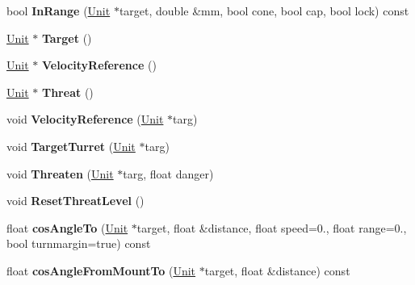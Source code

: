 \begin{DoxyCompactItemize}
\item 
bool {\bfseries In\+Range} (\hyperlink{classUnit}{Unit} $\ast$target, double \&mm, bool cone, bool cap, bool lock) const \hypertarget{classUnit_ac5838cd5a2f8cb75fe567662afcbe899}{}\label{classUnit_ac5838cd5a2f8cb75fe567662afcbe899}

\item 
\hyperlink{classUnit}{Unit} $\ast$ {\bfseries Target} ()\hypertarget{classUnit_a7716836bf2d5b411a380e64ae47b8523}{}\label{classUnit_a7716836bf2d5b411a380e64ae47b8523}

\item 
\hyperlink{classUnit}{Unit} $\ast$ {\bfseries Velocity\+Reference} ()\hypertarget{classUnit_aca84fd72d674597d57c82a50035d31e9}{}\label{classUnit_aca84fd72d674597d57c82a50035d31e9}

\item 
\hyperlink{classUnit}{Unit} $\ast$ {\bfseries Threat} ()\hypertarget{classUnit_a63be532632c7f513ca2d74a41ee18498}{}\label{classUnit_a63be532632c7f513ca2d74a41ee18498}

\item 
void {\bfseries Velocity\+Reference} (\hyperlink{classUnit}{Unit} $\ast$targ)\hypertarget{classUnit_ad06dffadc235ca125e32af477b0a5e54}{}\label{classUnit_ad06dffadc235ca125e32af477b0a5e54}

\item 
void {\bfseries Target\+Turret} (\hyperlink{classUnit}{Unit} $\ast$targ)\hypertarget{classUnit_a0821361af528c13ad875289aec584599}{}\label{classUnit_a0821361af528c13ad875289aec584599}

\item 
void {\bfseries Threaten} (\hyperlink{classUnit}{Unit} $\ast$targ, float danger)\hypertarget{classUnit_a790cbe6ad8231dfc848b898a113e755c}{}\label{classUnit_a790cbe6ad8231dfc848b898a113e755c}

\item 
void {\bfseries Reset\+Threat\+Level} ()\hypertarget{classUnit_ae3b1150e80b1674111a178e32de97875}{}\label{classUnit_ae3b1150e80b1674111a178e32de97875}

\item 
float {\bfseries cos\+Angle\+To} (\hyperlink{classUnit}{Unit} $\ast$target, float \&distance, float speed=0., float range=0., bool turnmargin=true) const \hypertarget{classUnit_aa61636e497f31e6c894e9de66770736c}{}\label{classUnit_aa61636e497f31e6c894e9de66770736c}

\item 
float {\bfseries cos\+Angle\+From\+Mount\+To} (\hyperlink{classUnit}{Unit} $\ast$target, float \&distance) const \hypertarget{classUnit_aef949e5686d8ef63fc72b8f5a1de41b7}{}\label{classUnit_aef949e5686d8ef63fc72b8f5a1de41b7}


\end{DoxyCompactItemize}
